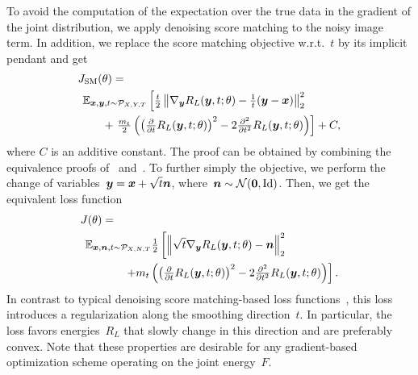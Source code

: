\documentclass{article}
\newcommand{\id}{\mathrm{Id}}
\newcommand{\norm}[1]{\left\Vert#1\right\Vert}
\renewcommand{\vec}[1]{\mathbf{#1}}
\newcommand{\dist}[1]{\mathcal{P}_{#1}}
\theoremstyle{plain}
\theoremstyle{definition}
\theoremstyle{remark}
\begin{document}
To avoid the computation of the expectation over the true data in the gradient of the joint distribution, we apply denoising score matching to the noisy image term.
In addition, we replace the score matching objective w.r.t.~$t$ by its implicit pendant and get
\begin{align*}
&J_\mathrm{SM}(\theta)=\\
&\hspace{1ex}\E_{\vx,\vy,t\sim\dist{X,Y,T}}\left[\tfrac{t}{2}\norm{\nabla_\vy R_L(\vy,t;\theta) -\tfrac{1}{t}(\vy-\vx)}_2^2 \right.\\
&\hspace{5ex}+ \left. \tfrac{m_t}{2}\left(\left(\tfrac{\partial}{\partial t}R_L(\vy,t;\theta)\right)^2 -2\tfrac{\partial^2}{\partial t^2}R_L(\vy,t;\theta)\right)\right] + C,
\end{align*}
where $C$ is an additive constant.
The proof can be obtained by combining the equivalence proofs of~\citet{Hy05} and~\citet{Vi11}.
To further simply the objective, we perform the change of variables~${\bm{y}}={\bm{x}}+\sqrt{t}{\bm{n}}$, where~$\vn\sim\mathcal{N}(\vec{0},\id)$.
Then, we get the equivalent loss function
\begin{align} \label{eq:loss}
&J(\theta)=\\
&\hspace{1ex}\E_{\vx,\vn,t\sim\dist{X,N,T}}\tfrac{1}{2}\left[\norm{\sqrt{t}\nabla_\vy R_L(\vy,t;\theta) -\vn}_2^2\right. \notag\\ 
&\hspace{9ex}\left.+m_t\left(\left(\tfrac{\partial}{\partial t}R_L(\vy,t;\theta)\right)^2 -2\tfrac{\partial^2}{\partial t^2}R_L(\vy,t;\theta)\right)\right]. \notag
\end{align}
In contrast to typical denoising score matching-based loss functions~\citep{SoEr19,HoJa20}, this loss introduces a regularization along the smoothing direction~$t$.
In particular, the loss favors energies~$R_L$ that slowly change in this direction and are preferably convex.
Note that these properties are desirable for any gradient-based optimization scheme operating on the joint energy~$F$.
\end{document}
